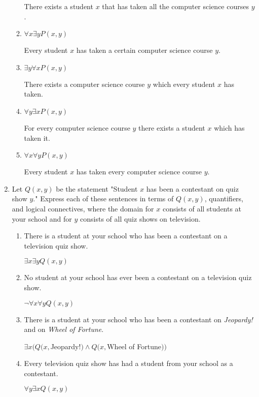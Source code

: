 \documentclass[11pt]{article}
\begin{document}
\begin{enumerate}[label=\textbf{\arabic*.}]
\begin{enumerate}[label=\textbf{\alph*)}]
		There exists a student $x$ that has taken all the computer science courses $y$.
		
		\item $\forall x\exists yP(x, y)$
		
		Every student $x$ has taken a certain computer science course $y$.
		
		\item $\exists y\forall xP(x, y)$
		
		There exists a computer science course $y$ which every student $x$ has taken.
		
		\item $\forall y\exists xP(x, y)$
		
		For every computer science course $y$ there exists a student $x$ which has taken it.
		
		\item $\forall x\forall yP(x, y)$
		
		Every student $x$ has taken every computer science course $y$.
	\end{enumerate}

	\item Let $Q(x, y)$ be the statement "Student $x$ has been a contestant on quiz show $y$." Express each of these sentences in terms of $Q(x, y)$, quantifiers, and logical connectives, where the domain for $x$ consists of all students at your school and for $y$ consists of all quiz shows on television.
	\begin{enumerate}[label=\textbf{\alph*)}]
		\item There is a student at your school who has been a contestant on a television quiz show.
		
		$\exists x\exists yQ(x, y)$
		
		\item No student at your school has ever been a contestant on a television quiz show.
		
		$\neg\forall x\forall y Q(x, y)$
		
		\item There is a student at your school who has been a contestant on \emph{Jeopardy!} and on \emph{Wheel of Fortune}.
		
		$\exists x(Q(x, $Jeopardy!$) \land Q(x, $Wheel of Fortune$))$
		
		\item Every television quiz show has had a student from your school as a contestant.
		
		$\forall y\exists xQ(x, y)$
		

\end{enumerate}
\end{enumerate}
\end{document}
